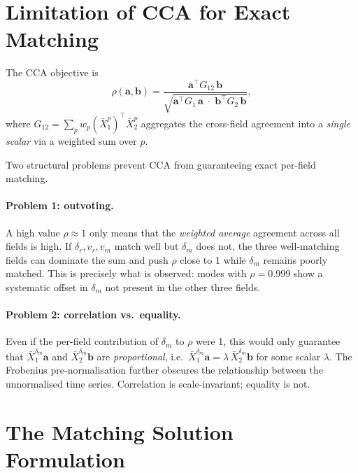\documentclass[a4paper,11pt]{article}
\newcommand{\va}{\bm{a}}
\newcommand{\vb}{\bm{b}}
\newcommand{\Xn}[2]{\bar{X}_{#1}^{#2}}
\newcommand{\Gb}[1]{G_{#1}}
\theoremstyle{plain}
\begin{document}
\section{Limitation of CCA for Exact Matching}
\label{sec:cca-limit}

The CCA objective is
\begin{equation}
    \rho(\va,\vb) = \frac{\va^\top \Gb{12}\,\vb}{\sqrt{\va^\top \Gb{1}\,\va
    \;\cdot\; \vb^\top \Gb{2}\,\vb}},
    \label{eq:cca}
\end{equation}
where $\Gb{12} = \sum_p w_p (\Xn{1}{p})^\top \Xn{2}{p}$ aggregates the
cross-field agreement into a \emph{single scalar} via a weighted sum over $p$.

Two structural problems prevent CCA from guaranteeing exact per-field matching.

\paragraph{Problem 1: outvoting.}
A high value $\rho \approx 1$ only means that the \emph{weighted average}
agreement across all fields is high.
If $\delta_r, v_r, v_m$ match well but $\delta_m$ does not, the three
well-matching fields can dominate the sum and push $\rho$ close to 1 while
$\delta_m$ remains poorly matched.
This is precisely what is observed: modes with $\rho = 0.999$ show a systematic
offset in $\delta_m$ not present in the other three fields.

\paragraph{Problem 2: correlation vs.\ equality.}
Even if the per-field contribution of $\delta_m$ to $\rho$ were 1, this would
only guarantee that $\Xn{1}{\delta_m}\va$ and $\Xn{2}{\delta_m}\vb$ are
\emph{proportional}, i.e.\
$\Xn{1}{\delta_m}\va = \lambda\,\Xn{2}{\delta_m}\vb$ for some scalar $\lambda$.
The Frobenius pre-normalisation further obscures the relationship between the
unnormalised time series.
Correlation is scale-invariant; equality is not.

\section{The Matching Solution Formulation}
\label{sec:matching}
\end{document}
